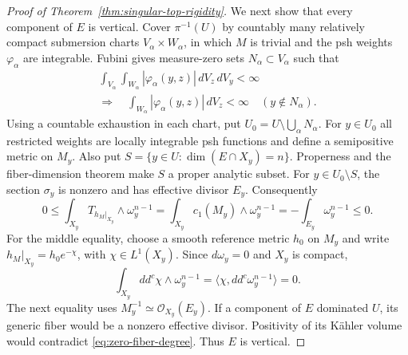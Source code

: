 \documentclass[11pt,reqno]{amsart}
\numberwithin{equation}{section}
\theoremstyle{definition}
\theoremstyle{remark}
\begin{document}
\begin{proof}[Proof of Theorem~\ref{thm:singular-top-rigidity}]
We next show that every component of $E$ is vertical. Cover
$\pi^{-1}(U)$ by countably many relatively compact submersion charts
$V_\alpha\times W_\alpha$, in which $M$ is trivial and the psh weights
$\varphi_\alpha$ are integrable. Fubini gives measure-zero sets
$N_\alpha\subset V_\alpha$ such that
\[
 \begin{gathered}
 \int_{V_\alpha}\int_{W_\alpha}
 |\varphi_\alpha(y,z)|\,dV_z\,dV_y<\infty
 \\
 \Longrightarrow\quad
 \int_{W_\alpha}|\varphi_\alpha(y,z)|\,dV_z<\infty
 \quad(y\notin N_\alpha).
 \end{gathered}
\]
Using a countable exhaustion in each chart, put
$U_0=U\setminus\bigcup_\alpha N_\alpha$. For $y\in U_0$ all restricted
weights are locally integrable psh functions and define a semipositive
metric on $M_y$. Also put
$S=\{y\in U:\dim(E\cap X_y)=n\}$. Properness and the fiber-dimension
theorem make $S$ a proper analytic subset. For $y\in U_0\setminus S$,
the section $\sigma_y$ is nonzero and has effective divisor $E_y$.
Consequently
\begin{equation}\label{eq:zero-fiber-degree}
 0\leq\int_{X_y}T_{h_M|_{X_y}}\wedge\omega_y^{n-1}
 =\int_{X_y}c_1(M_y)\wedge\omega_y^{n-1}
 =-\int_{E_y}\omega_y^{n-1}\leq0.
\end{equation}
For the middle equality, choose a smooth reference metric $h_0$ on
$M_y$ and write $h_M|_{X_y}=h_0e^{-\chi}$, with
$\chi\in L^1(X_y)$. Since $d\omega_y=0$ and $X_y$ is compact,
\[
 \int_{X_y}dd^c\chi\wedge\omega_y^{n-1}
 =\langle\chi,dd^c\omega_y^{n-1}\rangle=0.
\]
The next equality uses $M_y^{-1}\simeq\mathcal O_{X_y}(E_y)$.
If a component of $E$ dominated $U$, its generic fiber would be a
nonzero effective divisor. Positivity of its K\"ahler volume would
contradict \eqref{eq:zero-fiber-degree}. Thus $E$ is vertical.


\end{proof}
\end{document}
